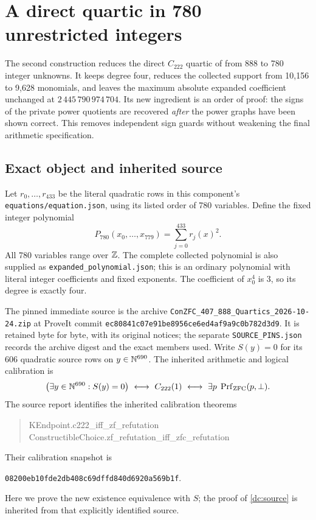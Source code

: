 \section{A direct quartic in 780 unrestricted integers}\label{dc:section}

The second construction reduces the direct $C_{222}$ quartic of
\cite{direct407} from 888 to 780 integer unknowns.  It keeps degree four,
reduces the collected support from 10,156 to 9,628 monomials, and leaves
the maximum absolute expanded coefficient unchanged at
$2\,445\,790\,974\,704$.  Its new ingredient is an order of proof:
the signs of the private power quotients are recovered \emph{after}
the power graphs have been shown correct.  This removes independent
sign guards without weakening the final arithmetic specification.

\subsection{Exact object and inherited source}

Let $r_0,\ldots,r_{433}$ be the literal quadratic rows in this component's
\texttt{equations/equation.json}, using its listed order of 780 variables.
Define the fixed integer polynomial
\begin{equation}\label{dc:polynomial}
 P_{780}(x_0,\ldots,x_{779})=\sum_{j=0}^{433}r_j(x)^2.
\end{equation}
All 780 variables range over $\mathbb Z$.  The complete collected polynomial is
also supplied as \texttt{expanded\_polynomial.json}; this is an ordinary
polynomial with literal integer coefficients and fixed exponents.
The coefficient of $x_0^4$ is 3, so its degree is exactly four.

The pinned immediate source is the archive
\texttt{ConZFC\_407\_888\_Quartics\_2026-10-24.zip}
at ProveIt commit
\texttt{ec80841c07e91be8956ce6ed4af9a9c0b782d3d9}.
It is retained byte for byte, with its original notices; the separate
\texttt{SOURCE\_PINS.json} records the archive digest and the exact members
used.  Write $S(y)=0$ for its 606 quadratic source rows on $y\in\mathbb N^{690}$.
The inherited arithmetic and logical calibration is
\begin{equation}\label{dc:source}
 \bigl(\exists y\in\mathbb N^{690}: S(y)=0\bigr)
 \ \longleftrightarrow\ C_{222}(1)
 \ \longleftrightarrow\
 \exists p\;\operatorname{Prf}_{\mathrm{ZFC}}(p,\bot).
\end{equation}
The source report identifies the inherited calibration theorems
\begin{quote}\small\ttfamily
KEndpoint.c222\_iff\_zf\_refutation\\
ConstructibleChoice.zf\_refutation\_iff\_zfc\_refutation
\end{quote}
Their calibration snapshot is
\begin{center}\small
\texttt{08200eb10fde2db408c69dffd840d6920a569b1f}.
\end{center}
Here we prove the new existence equivalence with $S$; the proof of
\eqref{dc:source} is inherited from that explicitly identified source.

